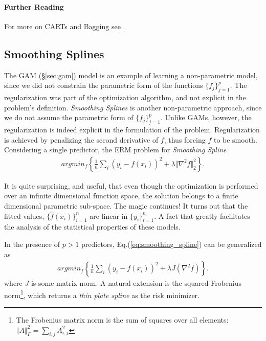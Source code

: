 \documentclass[12pt,a4paper]{article}
\theoremstyle{plain}
\theoremstyle{definition}
\newcommand{\norm}[1]{\Vert #1 \Vert}
\newcommand{\argmin}[2]{argmin_{#1}\left\{ #2 \right\}}
\newcommand{\hyp}{f}
\begin{document}
\paragraph{Further Reading}
For more on CARTs and Bagging see \citep[Section 9]{hastie_elements_2003}.



\subsection{Smoothing Splines}
\label{sec:smoothing_splines}
The GAM (\S\ref{sec:gam}) model is an example of learning a non-parametric model, since we did not constrain the parametric form of the functions $\{f_j\}_{j=1}^p$. The regularization was part of the optimization algorithm, and not explicit in the problem's definition.
\emph{Smoothing Splines} is another non-parametric approach, since we do not assume the parametric form of $\{f_j\}_{j=1}^p$. 
Unlike GAMs, however, the regularization is indeed explicit in the formulation of the problem. 
Regularization is achieved by penalizing the second derivative of $\hyp$, thus forcing $\hyp$ to be smooth. 
Considering a single predictor, the ERM problem for \emph{Smoothing Spline}
\begin{align}
\label{eq:smoothing_spline}
	 \argmin{\hyp}{\frac{1}{n}\sum_i (y_i-\hyp(x_i))^2 + \lambda \norm{\nabla^2 f}_2^2  }.
\end{align}

It is quite surprising, and useful, that even though the optimization is performed over an infinite dimensional function space, the solution belongs to a finite dimensional parametric sub-space. 
The magic continues! It turns out that the fitted values, $\{\hat{\hyp}(x_i)\}_{i=1}^n$ are linear in $\{y_i\}_{i=1}^n$. A fact that greatly facilitates the analysis of the statistical properties of these models.

In the presence of $p>1$ predictors, Eq.(\ref{eq:smoothing_spline}) can be generalized as 
\begin{align}
\label{eq:smoothing_spline_multi}
	 \argmin{\hyp}{\frac{1}{n}\sum_i (y_i-\hyp(x_i))^2 + \lambda J(\nabla^2 f)  }.
\end{align}
where $J$ is some matrix norm. A natural extension is the squared Frobenius norm\footnote{The Frobenius matrix norm is the sum of squares over all elements: $\norm{A}^2_F=\sum_{i,j} A_{i,j}^2$ }, which returns a \emph{thin plate spline} as the risk minimizer.
\end{document}
